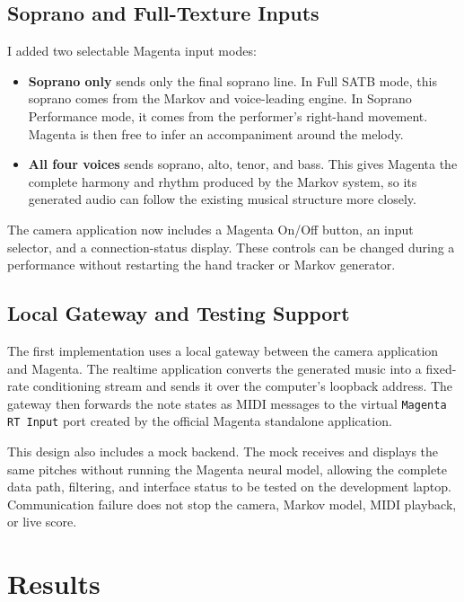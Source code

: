 \documentclass[11pt,a4paper]{article}
\begin{document}
\subsection{Soprano and Full-Texture Inputs}

I added two selectable Magenta input modes:

\begin{itemize}
    \item \textbf{Soprano only} sends only the final soprano line. In Full SATB
    mode, this soprano comes from the Markov and voice-leading engine. In
    Soprano Performance mode, it comes from the performer's right-hand
    movement. Magenta is then free to infer an accompaniment around the melody.
    \item \textbf{All four voices} sends soprano, alto, tenor, and bass. This
    gives Magenta the complete harmony and rhythm produced by the Markov system,
    so its generated audio can follow the existing musical structure more
    closely.
\end{itemize}

The camera application now includes a Magenta On/Off button, an input selector,
and a connection-status display. These controls can be changed during a
performance without restarting the hand tracker or Markov generator.

\subsection{Local Gateway and Testing Support}

The first implementation uses a local gateway between the camera application
and Magenta. The realtime application converts the generated music into a
fixed-rate conditioning stream and sends it over the computer's loopback
address. The gateway then forwards the note states as MIDI messages to the
virtual \texttt{Magenta RT Input} port created by the official Magenta
standalone application.

This design also includes a mock backend. The mock receives and displays the
same pitches without running the Magenta neural model, allowing the complete
data path, filtering, and interface status to be tested on the development
laptop. Communication failure does not stop the camera, Markov model, MIDI
playback, or live score.

\section{Results}
\end{document}
